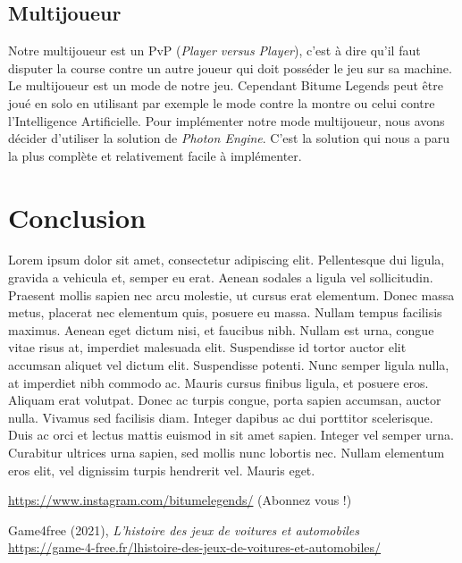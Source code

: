 \documentclass[11pt,a4paper]{article}
\begin{document}
{  \subsection{Multijoueur}
    Notre multijoueur est un PvP (\textit{Player versus Player}), c'est à dire qu'il faut disputer la course 
    contre un autre joueur qui doit posséder le jeu sur sa machine. Le multijoueur est un mode de notre jeu. 
    Cependant Bitume Legends peut être joué en solo en utilisant par exemple le mode contre la montre ou 
    celui contre l'Intelligence Artificielle. Pour implémenter notre mode multijoueur, nous avons décider 
    d'utiliser la solution de \emph{Photon Engine}.
    C'est la solution qui nous a paru la plus complète et relativement facile à implémenter.

\clearpage

\section{Conclusion}
  Lorem ipsum dolor sit amet, consectetur adipiscing elit. Pellentesque dui ligula, gravida a vehicula et, semper eu erat. Aenean sodales a ligula vel sollicitudin. Praesent mollis sapien nec arcu molestie, ut cursus erat elementum. Donec massa metus, placerat nec elementum quis, posuere eu massa. Nullam tempus facilisis maximus. Aenean eget dictum nisi, et faucibus nibh. Nullam est urna, congue vitae risus at, imperdiet malesuada elit. Suspendisse id tortor auctor elit accumsan aliquet vel dictum elit. Suspendisse potenti. Nunc semper ligula nulla, at imperdiet nibh commodo ac. Mauris cursus finibus ligula, et posuere eros.
  Aliquam erat volutpat. Donec ac turpis congue, porta sapien accumsan, auctor nulla. Vivamus sed facilisis diam. Integer dapibus ac dui porttitor scelerisque. Duis ac orci et lectus mattis euismod in sit amet sapien. Integer vel semper urna. Curabitur ultrices urna sapien, sed mollis nunc lobortis nec. Nullam elementum eros elit, vel dignissim turpis hendrerit vel. Mauris eget.
\clearpage

\begin{thebibliography}{9}
    \url{https://www.instagram.com/bitumelegends/} (Abonnez vous !)
  
    Game4free (2021), \emph{L'histoire des jeux de voitures et automobiles}\\
    \url{https://game-4-free.fr/lhistoire-des-jeux-de-voitures-et-automobiles/}


\end{thebibliography}}
\end{document}
